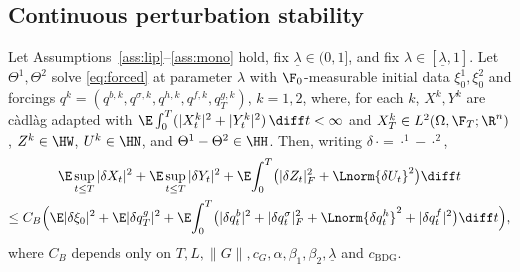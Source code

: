 \subsection{Continuous perturbation stability}

\begin{lemma}\label{lem:pert}
Let Assumptions~\ref{ass:lip}--\ref{ass:mono} hold, fix $\underline\lambda\in(0,1]$, and
fix $\lambda\in[\underline\lambda,1]$. Let
$\Theta^1,\Theta^2$ solve \eqref{eq:forced} at parameter $\lambda$ with $\F_0$-measurable
initial data $\xi_0^1,\xi_0^2$ and forcings
$q^k=(q^{b,k},q^{\sigma,k},q^{h,k},q^{f,k},q^{g,k}_T)$, $k=1,2$, where, for each $k$,
$X^k,Y^k$ are c\`adl\`ag adapted with
$\E\int_0^T(|X^k_t|^2+|Y^k_t|^2)\,\diff t<\infty$ and $X^k_T\in L^2(\Omega,\F_T;\R^n)$,
$Z^k\in\HW$, $U^k\in\HN$, and $\Theta^1-\Theta^2\in\HH$. Then, writing
$\delta\,{\cdot}={\cdot}^1-{\cdot}^2$,
\begin{multline}\label{eq:contpert}
\E\sup_{t\le T}|\delta X_t|^2+\E\sup_{t\le T}|\delta Y_t|^2
+\E\!\int_0^T\!\big(|\delta Z_t|_F^2+\Lnorm{\delta U_t}^2\big)\diff t\\
\le C_B\Big(\E|\delta\xi_0|^2+\E|\delta q^g_T|^2
+\E\!\int_0^T\!\big(|\delta q^b_t|^2+|\delta q^\sigma_t|_F^2
+\Lnorm{\delta q^h_t}^2+|\delta q^f_t|^2\big)\diff t\Big),
\end{multline}
where $C_B$ depends only on
$T,L,\|G\|,c_G,\alpha,\beta_1,\beta_2,\underline\lambda$ and $c_{\mathrm{BDG}}$.
\end{lemma}
